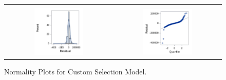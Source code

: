 \documentclass[11pt]{scrartcl} %
\begin{document}
\begin{figure}[H] %
	\centering
	\begin{tabular}{p{} p{}}
\hline	
	\multicolumn{1}{|c}{} &  \multicolumn{1}{c|}{} \\
		\multicolumn{1}{|c}{\includegraphics[width=0.48\textwidth]{../graphics/A2CustHist}} &
		\multicolumn{1}{c|}{\includegraphics[width=0.48\textwidth]{../graphics/A2Custqq}}\\
		\hline
	\end{tabular}		
	\caption{Normality Plots for Custom Selection Model.} %
	\label{fig:A2CustomQQ}
\end{figure}
\end{document}
